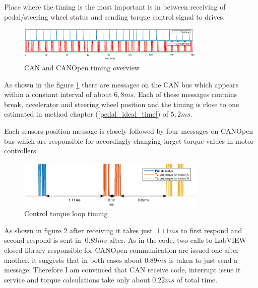 Place where the timing is the most important is in between receiving of pedal/steering wheel status and sending torque control signal to drives.
\begin{figure}[h]
    \centering
            \includegraphics[width=0.8\textwidth]{figures/perf_rep.eps}
            \caption{CAN and CANOpen timing overview}
            \label{perf_over}
\end{figure}

As shown in the figure \ref{perf_over} there are messages on the CAN bus which appears within a constant interval of about $6,8 ms$. Each of these messages contains break, accelerator and steering wheel position and the timing is close to one estimated in method chapter (\ref{pedal_ideal_time}) of $5,2 ms$.

Each sensors position message is closely followed by four messages on CANOpen bus which are responsible for accordingly changing target torque values in motor controllers. 
\begin{figure}[h]
    \centering
            \includegraphics[width=0.8\textwidth]{figures/perf.eps}
            \caption{Control torque loop timing}
            \label{perf}
\end{figure}
As shown in figure \ref{perf} after receiving it takes just $~1.11 ms$ to first respond and second respond is sent in $~0.89 ms$ after. As in the code, two calls to LabVIEW closed library responsible for CANOpen communication are issued one after another, it suggests that in both cases about $0.89 ms$ is taken to just send a message. Therefore I am convinced that CAN receive code, interrupt issue it service and torque calculations take only about $0.22 ms$ of total time.